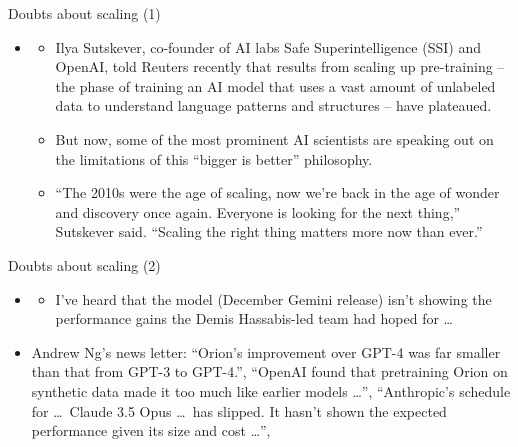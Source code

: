 

\begin{vbframe}{Doubts about scaling (1)}

\vfill

\begin{itemize}
\item {}
\begin{itemize}
\item Ilya Sutskever, co-founder of AI labs Safe Superintelligence
	(SSI) and OpenAI, told Reuters recently that results
	from scaling up pre-training -- the phase of training
	an AI model that uses a vast amount of unlabeled
	data to understand language patterns and structures
	-- have plateaued.
	\item
But now, some of the most prominent AI scientists are
speaking out on the limitations of this “bigger is better”
philosophy.
\item “The 2010s were the age of scaling, now we're back in
	the age of wonder and discovery once again. Everyone
	is looking for the next thing,” Sutskever
	said. “Scaling the right thing matters more now than ever.”
\end{itemize}
\end{itemize}


\vfill

\end{vbframe}


\begin{vbframe}{Doubts about scaling (2)}

\vfill

\begin{itemize}
\item {}
\begin{itemize}
\item I've heard that the model (December Gemini release) isn't showing the
	performance
        gains the Demis Hassabis-led team had hoped for \ldots
\end{itemize}
\item Andrew Ng's news letter:
``Orion’s improvement over GPT-4 was
far smaller than that from GPT-3 to GPT-4.'',
``OpenAI found that pretraining Orion on
synthetic data made it too much like earlier models \ldots'',
``Anthropic’s schedule for \ldots\ Claude 3.5 Opus \ldots\
has slipped. It
hasn’t shown the expected performance given its size and
cost \ldots'',
\end{itemize}


\vfill

\end{vbframe}

